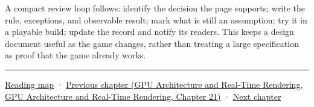 A compact review loop follows: identify the decision the page supports; write the rule, exceptions, and observable result; mark what is still an assumption; try it in a playable build; update the record and notify its readers. This keeps a design document useful as the game changes, rather than treating a large specification as proof that the game already works.

\begin{center}\rule{0.5\linewidth}{0.5pt}\end{center}

\hyperref[volume-reading-map]{Reading map} · \href{../06-GPU-Architecture-and-Real-Time-Rendering/main.pdf\#nameddest=06-engine-ii-ch045-rasterizing-kernels-and-connecting-world-identity}{Previous chapter (GPU Architecture and Real-Time Rendering, GPU Architecture and Real-Time Rendering, Chapter 21)} · \hyperref[06-engine-ii-ch047-narrative-simulation-and-ai-in-playable-worlds]{Next chapter}
